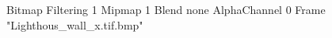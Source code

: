 {Bitmap
	{Filtering 1}
	{Mipmap 1}
	{Blend none}
	{AlphaChannel 0}
	{Frame "Lighthous_wall_x.tif.bmp"}
}
